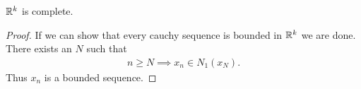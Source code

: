 \begin{proposition}
  $\mathbb{R}^k$ is complete.
\end{proposition}
\begin{proof}
  If we can show that every cauchy sequence is bounded in $\mathbb{R}^k$ we are done. There exists an $N$ such that
  \begin{align*}
    n\geq N \implies x_n \in N_{1}(x_N).
  \end{align*}
  Thus $x_n$ is a bounded sequence.
\end{proof}
